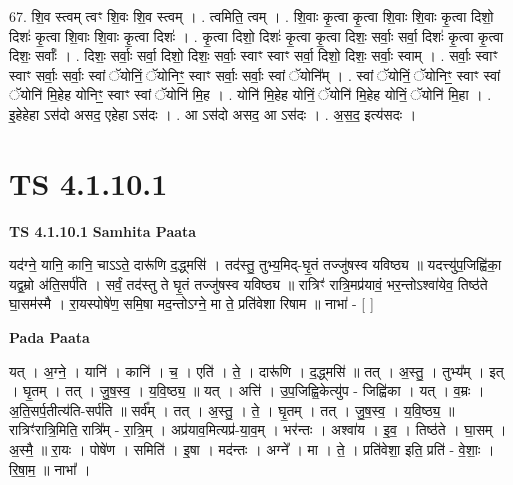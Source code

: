 \documentclass[17pt]{extarticle}
\begin{document}
67. शि॒व स्त्वम् त्वꣳ शि॒वः शि॒व स्त्वम् । . त्वमिति॒ त्वम् । . शि॒वाः कृ॒त्वा कृ॒त्वा शि॒वाः शि॒वाः कृ॒त्वा दिशो॒ दिशः॑ कृ॒त्वा शि॒वाः शि॒वाः कृ॒त्वा दिशः॑ । . कृ॒त्वा दिशो॒ दिशः॑ कृ॒त्वा कृ॒त्वा दिशः॒ सर्वाः॒ सर्वा॒ दिशः॑ कृ॒त्वा कृ॒त्वा दिशः॒ सर्वाः᳚ । . दिशः॒ सर्वाः॒ सर्वा॒ दिशो॒ दिशः॒ सर्वाः॒ स्वाꣳ स्वाꣳ सर्वा॒ दिशो॒ दिशः॒ सर्वाः॒ स्वाम् । . सर्वाः॒ स्वाꣳ स्वाꣳ सर्वाः॒ सर्वाः॒ स्वां ॅयोनिं॒ ॅयोनिꣳ॒॒ स्वाꣳ सर्वाः॒ सर्वाः॒ स्वां ॅयोनि᳚म् । . स्वां ॅयोनिं॒ ॅयोनिꣳ॒॒ स्वाꣳ स्वां ॅयोनि॑ मि॒हेह योनिꣳ॒॒ स्वाꣳ स्वां ॅयोनि॑ मि॒ह । . योनि॑ मि॒हेह योनिं॒ ॅयोनि॑ मि॒हेह योनिं॒ ॅयोनि॑ मि॒हा । . इ॒हेहेहा ऽस॑दो असद॒ एहेहा ऽस॑दः । . आ ऽस॑दो असद॒ आ ऽस॑दः । . अ॒स॒द॒ इत्य॑सदः । \newline
\pagebreak
{}

\section{ TS 4.1.10.1 }

\textbf{TS 4.1.10.1 } \newline
\textbf{Samhita Paata} \newline

यद॑ग्ने॒ यानि॒ कानि॒ चाऽऽते॒ दारू॑णि द॒द्ध्मसि॑ । तद॑स्तु॒ तुभ्य॒मिद्-घृ॒तं तज्जु॑षस्व यविष्ठ्य ॥ यदत्त्यु॑प॒जिह्वि॑का॒ यद्व॒म्रो अ॑ति॒सर्प॑ति । सर्वं॒ तद॑स्तु ते घृ॒तं तज्जु॑षस्व यविष्ठ्य ॥ रात्रिꣳ॑ रात्रि॒मप्र॑यावं॒ भर॒न्तोऽश्वा॑येव॒ तिष्ठ॑ते घा॒सम॑स्मै । रा॒यस्पोषे॑ण॒ समि॒षा मद॒न्तोऽग्ने॒ मा ते॒ प्रति॑वेशा रिषाम ॥ नाभा॑ - [  ] \newline

\textbf{Pada Paata} \newline

यत् । अ॒ग्ने॒ । यानि॑ । कानि॑ । च॒ । एति॑ । ते॒ । दारू॑णि । द॒द्ध्मसि॑ ॥ तत् । अ॒स्तु॒ । तुभ्य᳚म् । इत् । घृ॒तम् । तत् । जु॒ष॒स्व॒ । य॒वि॒ष्ठ्य॒ ॥ यत् । अत्ति॑ । उ॒प॒जिह्वि॒केत्यु॑प - जिह्वि॑का । यत् । व॒म्रः । अ॒ति॒सर्प॒तीत्य॑ति-सर्प॑ति ॥ सर्व᳚म् । तत् । अ॒स्तु॒ । ते॒ । घृ॒तम् । तत् । जु॒ष॒स्व॒ । य॒वि॒ष्ठ्य॒ ॥ रात्रिꣳ॑रात्रि॒मिति॒ रात्रि᳚म् - रा॒त्रि॒म् । अप्र॑याव॒मित्यप्र॑-या॒व॒म् । भर॑न्तः । अश्वा॑य । इ॒व॒ । तिष्ठ॑ते । घा॒सम् । अ॒स्मै॒ ॥ रा॒यः । पोषे॑ण । समिति॑ । इ॒षा । मद॑न्तः । अग्ने᳚ । मा । ते॒ । प्रति॑वेशा॒ इति॒ प्रति॑ - वे॒शाः॒ । रि॒षा॒म॒ ॥ नाभा᳚ ।  \newline
\end{document}
